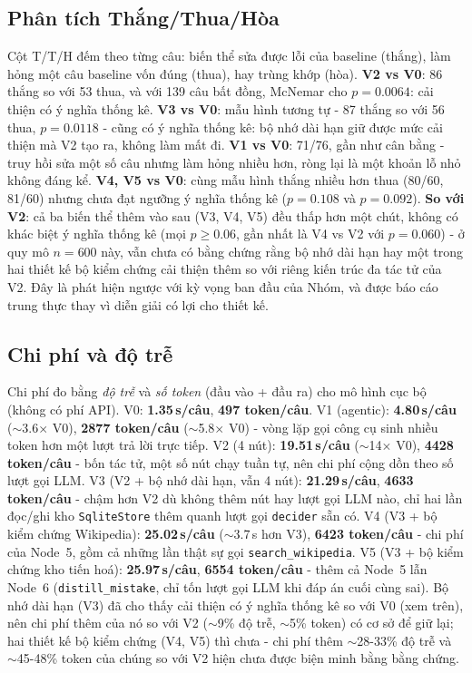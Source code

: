 \documentclass[11pt]{article}
\begin{document}
\subsection{Phân tích Thắng/Thua/Hòa}
Cột T/T/H đếm theo từng câu: biến thể sửa được lỗi của baseline (thắng), làm hỏng một câu baseline vốn
đúng (thua), hay trùng khớp (hòa). \textbf{V2 vs V0}: 86 thắng so với 53 thua, và với 139 câu bất đồng,
McNemar cho $p{=}0.0064$: cải thiện có ý nghĩa thống kê. \textbf{V3 vs V0}: mẫu hình tương tự - 87
thắng so với 56 thua, $p{=}0.0118$ - cũng có ý nghĩa thống kê: bộ nhớ dài hạn giữ được mức cải thiện mà
V2 tạo ra, không làm mất đi. \textbf{V1 vs V0}: 71/76, gần như cân bằng - truy hồi sửa một số câu nhưng
làm hỏng nhiều hơn, ròng lại là một khoản lỗ nhỏ không đáng kể. \textbf{V4, V5 vs V0}: cùng mẫu hình
thắng nhiều hơn thua (80/60, 81/60) nhưng chưa đạt ngưỡng ý nghĩa thống kê ($p{=}0.108$ và
$p{=}0.092$). \textbf{So với V2}: cả ba biến thể thêm vào sau (V3, V4, V5) đều thấp hơn một chút, không
có khác biệt ý nghĩa thống kê (mọi $p{\geq}0.06$, gần nhất là V4 vs V2 với $p{=}0.060$) - ở quy mô
$n{=}600$ này, vẫn chưa có bằng chứng rằng bộ nhớ dài hạn hay một trong hai thiết kế bộ kiểm chứng cải
thiện thêm so với riêng kiến trúc đa tác tử của V2. Đây là phát hiện ngược với kỳ vọng ban đầu của
Nhóm, và được báo cáo trung thực thay vì diễn giải có lợi cho thiết kế.

\subsection{Chi phí và độ trễ}
Chi phí đo bằng \emph{độ trễ} và \emph{số token} (đầu vào + đầu ra) cho mô hình cục bộ (không có phí
API). V0: \textbf{1.35\,s/câu}, \textbf{497 token/câu}. V1 (agentic): \textbf{4.80\,s/câu}
($\sim$3.6$\times$ V0), \textbf{2877 token/câu} ($\sim$5.8$\times$ V0) - vòng lặp gọi công cụ sinh
nhiều token hơn một lượt trả lời trực tiếp. V2 (4 nút): \textbf{19.51\,s/câu} ($\sim$14$\times$ V0),
\textbf{4428 token/câu} - bốn tác tử, một số nút chạy tuần tự, nên chi phí cộng dồn theo số lượt gọi
LLM. V3 (V2 + bộ nhớ dài hạn, vẫn 4 nút): \textbf{21.29\,s/câu}, \textbf{4633 token/câu} - chậm hơn V2
dù không thêm nút hay lượt gọi LLM nào, chỉ hai lần đọc/ghi kho \texttt{SqliteStore} thêm quanh lượt
gọi \texttt{decider} sẵn có. V4 (V3 + bộ kiểm chứng Wikipedia): \textbf{25.02\,s/câu} ($\sim$3.7\,s hơn
V3), \textbf{6423 token/câu} - chi phí của Node~5, gồm cả những lần thật sự gọi
\texttt{search\_wikipedia}. V5 (V3 + bộ kiểm chứng kho tiến hoá): \textbf{25.97\,s/câu}, \textbf{6554
token/câu} - thêm cả Node~5 lẫn Node~6 (\texttt{distill\_mistake}, chỉ tốn lượt gọi LLM khi đáp án
cuối cùng sai). Bộ nhớ dài hạn (V3) đã cho thấy cải thiện có ý nghĩa thống kê so với V0 (xem trên), nên
chi phí thêm của nó so với V2 ($\sim$9\% độ trễ, $\sim$5\% token) có cơ sở để giữ lại; hai thiết kế bộ
kiểm chứng (V4, V5) thì chưa - chi phí thêm $\sim$28-33\% độ trễ và $\sim$45-48\% token của chúng so
với V2 hiện chưa được biện minh bằng bằng chứng.
\end{document}
